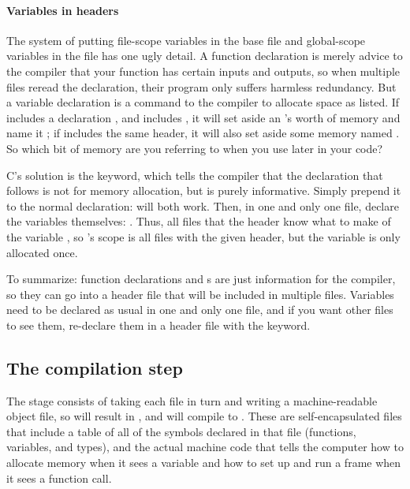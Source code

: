 \paragraph{\treesymbol Variables in headers} \label{extern} The system of
putting file-scope variables in the base  file and global-scope
variables in the  file has one ugly detail. A
function declaration is merely advice to the compiler that your function
has certain inputs and outputs, so when multiple files reread the
declaration, their program only suffers harmless redundancy. But a
variable declaration is a command to the compiler to allocate space as
listed. If  includes a declaration , and
 includes , it will set aside an
's worth of memory and name it ; if 
includes the same header, it will also set aside some memory
named . So which bit of memory are you referring to when you use
 later in your code? 

C's solution is the  keyword, which tells the compiler that
the declaration that follows is not for memory allocation, but is purely
informative. Simply prepend it to the normal declaration:  will both work. Then, in one and only one
 file, declare the variables themselves: . Thus, all files that  the header know what to make of
the variable , so 's scope is all files with the given
header, but the variable is only allocated once.

To summarize: function declarations and s are just information
for the compiler, so they can go into a header file that will be included
in multiple  files. Variables need to be declared as usual in
one and only one  file, and if you want other  files to
see them, re-declare them in a header file with the  keyword.

\subsection{The compilation step} 
The 
stage consists of taking each  file in turn and
writing a machine-readable object file, so  will
result in , and  will compile to
. These  are self-encapsulated
files that include a table of all of the symbols declared in that file
(functions, variables, and types), and 
the actual machine code that tells the computer how to allocate memory
when it sees a variable and how to set up and run a frame when it sees a
function call.

